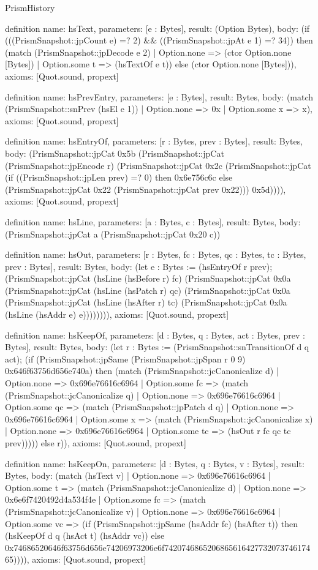 \begin{lexlean}{PrismHistory}
\begin{semanticmodule}
definition{
  name: hsText,
  parameters: [e : Bytes],
  result: (Option Bytes),
  body: (if (((PrismSnapshot::jpCount e) =? 2) && ((PrismSnapshot::jpAt e 1) =? 34)) then (match (PrismSnapshot::jpDecode e 2)
    | Option.none => (ctor Option.none [Bytes])
    | Option.some t => (hsTextOf e t)) else (ctor Option.none [Bytes])),
  axioms: [Quot.sound, propext]
}

definition{
  name: hsPrevEntry,
  parameters: [e : Bytes],
  result: Bytes,
  body: (match (PrismSnapshot::snPrev (hsEl e 1)) | Option.none => 0x | Option.some x => x),
  axioms: [Quot.sound, propext]
}

definition{
  name: hsEntryOf,
  parameters: [r : Bytes, prev : Bytes],
  result: Bytes,
  body: (PrismSnapshot::jpCat 0x5b (PrismSnapshot::jpCat (PrismSnapshot::jpEncode r) (PrismSnapshot::jpCat 0x2c (PrismSnapshot::jpCat (if ((PrismSnapshot::jpLen prev) =? 0) then 0x6e756c6c else (PrismSnapshot::jpCat 0x22 (PrismSnapshot::jpCat prev 0x22))) 0x5d)))),
  axioms: [Quot.sound, propext]
}

definition{
  name: hsLine,
  parameters: [a : Bytes, c : Bytes],
  result: Bytes,
  body: (PrismSnapshot::jpCat a (PrismSnapshot::jpCat 0x20 c))
}

definition{
  name: hsOut,
  parameters: [r : Bytes, fc : Bytes, qc : Bytes, tc : Bytes, prev : Bytes],
  result: Bytes,
  body: (let e : Bytes := (hsEntryOf r prev); (PrismSnapshot::jpCat (hsLine (hsBefore r) fc) (PrismSnapshot::jpCat 0x0a (PrismSnapshot::jpCat (hsLine (hsPatch r) qc) (PrismSnapshot::jpCat 0x0a (PrismSnapshot::jpCat (hsLine (hsAfter r) tc) (PrismSnapshot::jpCat 0x0a (hsLine (hsAddr e) e)))))))),
  axioms: [Quot.sound, propext]
}

definition{
  name: hsKeepOf,
  parameters: [d : Bytes, q : Bytes, act : Bytes, prev : Bytes],
  result: Bytes,
  body: (let r : Bytes := (PrismSnapshot::snTransitionOf d q act); (if (PrismSnapshot::jpSame (PrismSnapshot::jpSpan r 0 9) 0x646f63756d656e740a) then (match (PrismSnapshot::jcCanonicalize d)
    | Option.none => 0x696e76616c6964
    | Option.some fc => (match (PrismSnapshot::jcCanonicalize q)
      | Option.none => 0x696e76616c6964
      | Option.some qc => (match (PrismSnapshot::jpPatch d q)
        | Option.none => 0x696e76616c6964
        | Option.some x => (match (PrismSnapshot::jcCanonicalize x)
          | Option.none => 0x696e76616c6964
          | Option.some tc => (hsOut r fc qc tc prev))))) else r)),
  axioms: [Quot.sound, propext]
}

definition{
  name: hsKeepOn,
  parameters: [d : Bytes, q : Bytes, v : Bytes],
  result: Bytes,
  body: (match (hsText v)
    | Option.none => 0x696e76616c6964
    | Option.some t => (match (PrismSnapshot::jcCanonicalize d)
      | Option.none => 0x6e6f7420492d4a534f4e
      | Option.some fc => (match (PrismSnapshot::jcCanonicalize v)
        | Option.none => 0x696e76616c6964
        | Option.some vc => (if (PrismSnapshot::jpSame (hsAddr fc) (hsAfter t)) then (hsKeepOf d q (hsAct t) (hsAddr vc)) else 0x74686520646f63756d656e74206973206e6f742074686520686561642773207374617465)))),
  axioms: [Quot.sound, propext]
}


\end{semanticmodule}
\end{lexlean}
